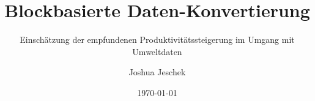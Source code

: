 \newcommand{\organization}{
    Technische Universität Chemnitz \\
    Fakultät Informatik \\
    Professur Medieninformatik \\
}
\newcommand{\thesistype}{Bachelorarbeit}
\newcommand{\degree}{Bachelor of Science}
\author{Joshua Jeschek}
\title{Blockbasierte Daten-Konvertierung}
\subtitle{Einschätzung der empfundenen Produktivitätssteigerung im Umgang mit Umweltdaten}
\newcommand{\erstpruefer}{Dr. Thomas Wilhelm-Stein}
\newcommand{\zweitpruefer}{Dr. Werner Koch}
\newcommand{\place}{Chemnitz}
\date{\today{}}
